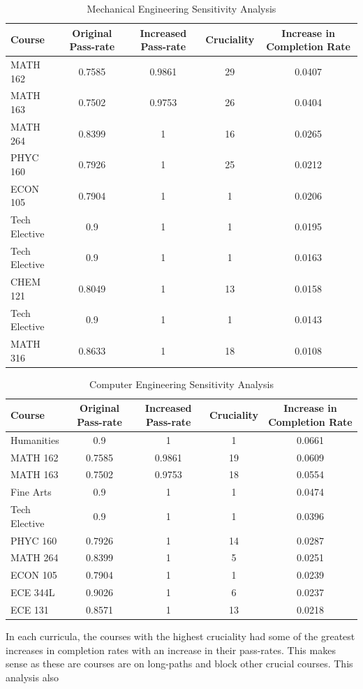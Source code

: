 \documentclass[botnum, fleqn]{unmeethesis}
\begin{document}
\begin{table}[!h]
\tiny
\begin{tabular}{l*{4}{c}}
Course & Original Pass-rate & Increased Pass-rate & Cruciality & Increase in Completion Rate \\
\hline
MATH 162 & 0.7585 & 0.9861 & 29 & 0.0407 \\
MATH 163 & 0.7502 & 0.9753 & 26 & 0.0404 \\
MATH 264 & 0.8399 & 1 & 16 & 0.0265 \\
PHYC 160 & 0.7926 & 1 & 25 & 0.0212 \\
ECON 105 & 0.7904 & 1 & 1 & 0.0206 \\
Tech Elective & 0.9 & 1 & 1 & 0.0195 \\
Tech Elective & 0.9 & 1 & 1 & 0.0163 \\
CHEM 121 & 0.8049 & 1 & 13 & 0.0158 \\
Tech Elective & 0.9 & 1 & 1 & 0.0143 \\
MATH 316 & 0.8633 & 1 & 18 & 0.0108 \\
\end{tabular}
\caption{Mechanical Engineering Sensitivity Analysis}
\label{tab:me_sensitivity}
\end{table}

\begin{table}[!h]
\tiny
\begin{tabular}{l*{4}{c}}
Course & Original Pass-rate & Increased Pass-rate & Cruciality & Increase in Completion Rate \\
\hline
Humanities & 0.9 & 1 & 1 & 0.0661 \\
MATH 162 & 0.7585 & 0.9861 & 19 & 0.0609 \\
MATH 163 & 0.7502 & 0.9753 & 18 & 0.0554 \\
Fine Arts & 0.9 & 1 & 1 & 0.0474 \\
Tech Elective & 0.9 & 1 & 1 & 0.0396 \\
PHYC 160 & 0.7926 & 1 & 14 & 0.0287 \\
MATH 264 & 0.8399 & 1 & 5 & 0.0251 \\
ECON 105 & 0.7904 & 1 & 1 & 0.0239 \\
ECE 344L & 0.9026 & 1 & 6 & 0.0237 \\
ECE 131 & 0.8571 & 1 & 13 & 0.0218 \\
\end{tabular}
\caption{Computer Engineering Sensitivity Analysis}
\label{tab:cpe_sensitivity}
\end{table}

In each curricula, the courses with the highest cruciality had some of the greatest increases in completion rates with an increase in their pass-rates. This makes sense as these are courses are on long-paths and block other crucial courses. This analysis also 
\end{document}
